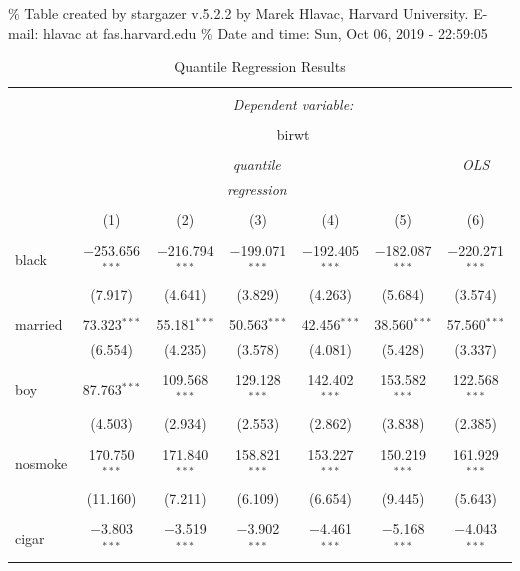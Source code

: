 \documentclass[]{book}
\begin{document}
\% Table created by stargazer v.5.2.2 by Marek Hlavac, Harvard
University. E-mail: hlavac at fas.harvard.edu \% Date and time: Sun, Oct
06, 2019 - 22:59:05

\begin{table}[!htbp] \centering 
  \caption{Quantile Regression Results} 
  \label{tab:} 
\begin{tabular}{@{\extracolsep{5pt}}lcccccc} 
\\[-1.8ex]\hline 
\hline \\[-1.8ex] 
 & \multicolumn{6}{c}{\textit{Dependent variable:}} \\ 
\cline{2-7} 
\\[-1.8ex] & \multicolumn{6}{c}{birwt} \\ 
\\[-1.8ex] & \multicolumn{5}{c}{\textit{quantile}} & \textit{OLS} \\ 
 & \multicolumn{5}{c}{\textit{regression}} & \textit{} \\ 
\\[-1.8ex] & (1) & (2) & (3) & (4) & (5) & (6)\\ 
\hline \\[-1.8ex] 
 black & $-$253.656$^{***}$ & $-$216.794$^{***}$ & $-$199.071$^{***}$ & $-$192.405$^{***}$ & $-$182.087$^{***}$ & $-$220.271$^{***}$ \\ 
  & (7.917) & (4.641) & (3.829) & (4.263) & (5.684) & (3.574) \\ 
  & & & & & & \\ 
 married & 73.323$^{***}$ & 55.181$^{***}$ & 50.563$^{***}$ & 42.456$^{***}$ & 38.560$^{***}$ & 57.560$^{***}$ \\ 
  & (6.554) & (4.235) & (3.578) & (4.081) & (5.428) & (3.337) \\ 
  & & & & & & \\ 
 boy & 87.763$^{***}$ & 109.568$^{***}$ & 129.128$^{***}$ & 142.402$^{***}$ & 153.582$^{***}$ & 122.568$^{***}$ \\ 
  & (4.503) & (2.934) & (2.553) & (2.862) & (3.838) & (2.385) \\ 
  & & & & & & \\ 
 nosmoke & 170.750$^{***}$ & 171.840$^{***}$ & 158.821$^{***}$ & 153.227$^{***}$ & 150.219$^{***}$ & 161.929$^{***}$ \\ 
  & (11.160) & (7.211) & (6.109) & (6.654) & (9.445) & (5.643) \\ 
  & & & & & & \\ 
 cigar & $-$3.803$^{***}$ & $-$3.519$^{***}$ & $-$3.902$^{***}$ & $-$4.461$^{***}$ & $-$5.168$^{***}$ & $-$4.043$^{***}$ \\ 

\end{tabular}
\end{table}
\end{document}
